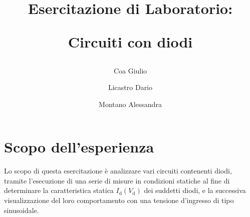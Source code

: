 \documentclass[a4paper]{article}
\title{
		\begin{center}
			Esercitazione di Laboratorio:
		\end{center}
		\newline
		\begin{center}
			Circuiti con diodi
		\end{center}
	}
\author{
			Coa Giulio
			\and
			Licastro Dario
			\and
			Montano Alessandra
		}
\begin{document}
	\begin{titlingpage}
		\maketitle
	\end{titlingpage}
	\newpage
	\section{Scopo dell'esperienza}
		Lo scopo di questa esercitazione è analizzare vari circuiti contenenti diodi, tramite l’esecuzione di una serie di misure in condizioni statiche al fine di determinare la caratteristica statica $ I_{\mathrm{d}}(V_{\mathrm{d}}) $ dei suddetti diodi, e la successiva visualizzazione del loro comportamento con una tensione d'ingresso di tipo sinusoidale.
\end{document}
